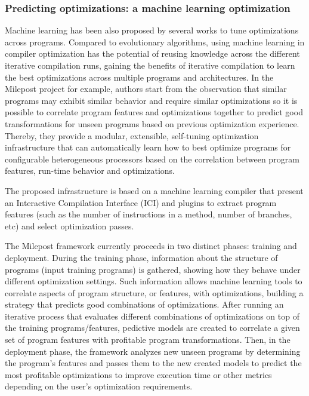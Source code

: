 \subsubsection{Predicting optimizations: a machine learning optimization}
Machine learning has been also proposed by several works to tune optimizations across programs. Compared to evolutionary algorithms, using machine learning in compiler optimization has the potential of reusing knowledge across the different iterative compilation runs, gaining the benefits of iterative compilation to learn the best optimizations across multiple programs and architectures.
In the Milepost project\cite{fursin2011milepost} for example, authors start from the observation that similar programs may exhibit similar behavior and require similar optimizations so it is possible to correlate program features and optimizations together to predict good transformations for unseen programs based on previous optimization experience. Thereby, they provide a modular, extensible, self-tuning optimization infrastructure that can automatically learn how to best optimize programs for configurable heterogeneous processors based on the correlation between program features, run-time behavior and optimizations. 

The proposed infrastructure is based on a machine learning compiler that present an Interactive Compilation Interface (ICI) and plugins to extract program features (such as the number of instructions in a method, number of branches, etc) and select optimization passes. 

The Milepost framework currently proceeds in two distinct phases: training and deployment. During the training phase, information about the structure of programs (input training programs) is gathered, showing how they behave under different optimization settings. Such information allows machine learning tools to correlate aspects of program structure, or features, with optimizations, building a strategy that predicts good combinations of optimizations. 
After running an iterative process that evaluates different combinations of optimizations on top of the training programs/features, pedictive models are created to correlate a given set of program features with profitable program transformations. 
Then, in the deployment phase, the framework analyzes new unseen programs by determining the program’s features and passes them to the new created models to predict the most profitable optimizations to improve execution time or other metrics depending on the user’s optimization requirements.

